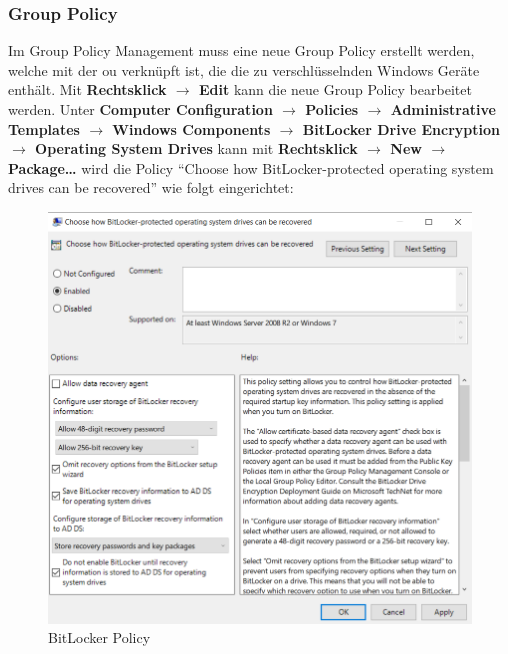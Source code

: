 \subsubsection{Group Policy}
Im Group Policy Management muss eine neue Group Policy erstellt werden, welche mit der \acrshort{ou} verknüpft ist, die die zu verschlüsselnden Windows Geräte enthält.
Mit \textbf{Rechtsklick $\rightarrow$ Edit} kann die neue Group Policy bearbeitet werden.
Unter \textbf{Computer Configuration $\rightarrow$ Policies $\rightarrow$ Administrative Templates $\rightarrow$ Windows Components $\rightarrow$ BitLocker Drive Encryption $\rightarrow$ Operating System Drives} kann mit \textbf{Rechtsklick $\rightarrow$ New $\rightarrow$ Package\dots} wird die Policy ``Choose how BitLocker-protected operating system drives can be recovered'' wie folgt eingerichtet:
\begin{figure}[H]
    \centering
    \includegraphics[width=0.7\linewidth]{../img/Encryption/store-bitlocker-in-ad.png}
    \caption{BitLocker Policy}
\end{figure}

